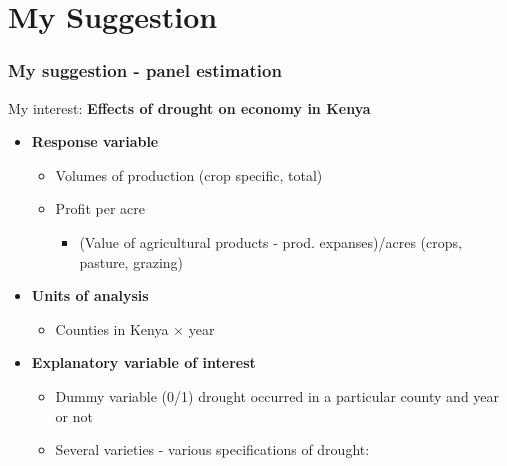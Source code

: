 \documentclass{beamer}              %
\begin{document}



\section{My Suggestion}


\begin{frame}

\frametitle{My suggestion - panel estimation}\label{MySuggestion1} 

My interest: \textbf{Effects of drought on economy in Kenya}
\begin{itemize}

\item \textbf{Response variable}

\begin{itemize}
\item Volumes of production (crop specific, total)
\item Profit per acre \normalsize{\citep{Deschenes2007Ric}}

\begin{itemize}
\item \footnotesize{(Value of agricultural products - prod. expanses)/acres (crops, pasture, grazing)}\\ 
\end{itemize}
\end{itemize}
\item \textbf{Units of analysis}
\begin{itemize}
\item Counties in Kenya $\times$ year
\
\end{itemize}


\item \textbf{Explanatory variable of interest}

\begin{itemize}
\item Dummy variable (0/1) drought occurred in a particular county and year or not
\item Several varieties - various specifications of drought:

\end{itemize}


\end{itemize}

\end{frame}
\end{document}
